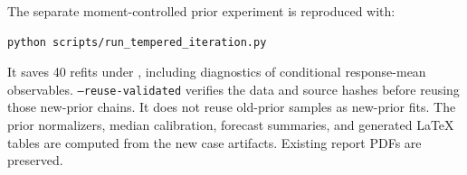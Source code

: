 The separate moment-controlled prior experiment is reproduced with:
\begingroup\small
\begin{verbatim}
python scripts/run_tempered_iteration.py
\end{verbatim}
\endgroup
It saves 40 refits under , including diagnostics of
conditional response-mean observables. \texttt{--reuse-validated} verifies
the data and source hashes before reusing those new-prior chains. It does
not reuse old-prior samples as new-prior fits. The prior normalizers,
median calibration, forecast summaries, and generated LaTeX tables are
computed from the new case artifacts. Existing report PDFs are preserved.
